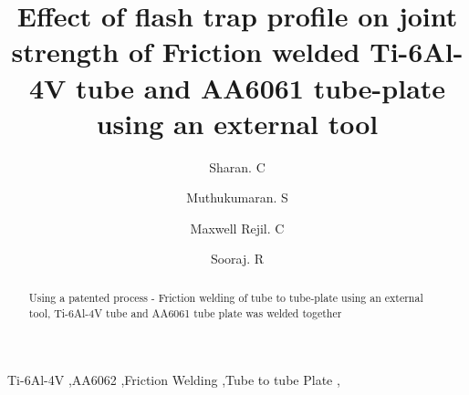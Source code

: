 \documentclass[3p,twocolumn]{elsarticle}
\begin{document}
\begin{frontmatter}



\title{Effect of flash trap profile on joint strength of Friction welded Ti-6Al-4V tube and AA6061 tube-plate using an external tool}


\author[META]{Sharan. C}
\author[META]{Muthukumaran. S}
\author[META]{Maxwell Rejil. C}
\author[META]{Sooraj. R}


\address[META]{Department of Metallurgical and Materials Engineering, National Institute of Technology, Tiruchirappalli-620015, India}
\begin{abstract}
Using a patented process - Friction welding of tube to tube-plate using an external tool, Ti-6Al-4V tube and AA6061 tube plate was welded together
\end{abstract}

\begin{keyword}
Ti-6Al-4V \sep AA6062 \sep Friction Welding \sep  Tube to tube Plate \sep 
\end{keyword}

\end{frontmatter}
\end{document}
